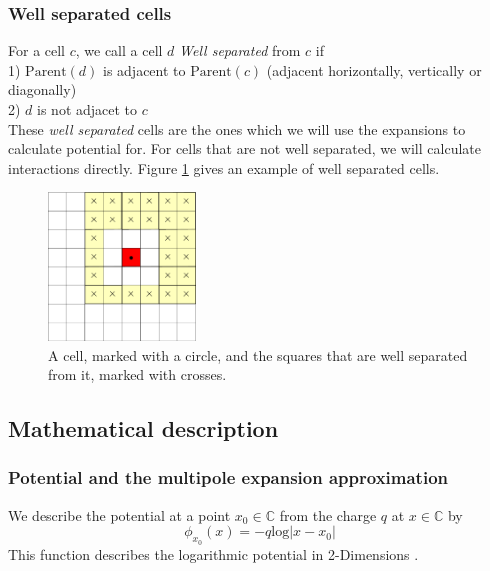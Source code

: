 \documentclass[pdftex,twoside,a4paper]{report}
\newcommand{\bcen}{\begin{center}}
\newcommand{\ecen}{\end{center}}
\begin{document}
\subsubsection{Well separated cells}
\label{sec:well_sep}
For a cell $c$, we call a cell $d$ \emph{Well separated} from $c$ if\\
1) $\text{Parent}(d)$ is adjacent to $\text{Parent}(c)$ (adjacent horizontally, vertically or diagonally)\\
2) $d$ is not adjacet to $c$\\
\newline
These \emph{well separated} cells are the ones which we will use the expansions to calculate potential for. For cells that are not well separated, we will calculate interactions directly. Figure \ref{fig:pme_wellsep} gives an example of well separated cells.
\begin{figure}[h]
\bcen \includegraphics[width=0.35\textwidth]{figures/wellsep.pdf} \ecen
\caption{A cell, marked with a circle, and the squares that are well separated from it, marked with crosses.}
\label{fig:pme_wellsep}
\end{figure}

\subsection{Mathematical description}
\label{sec:fma_math}
\subsubsection{Potential and the multipole expansion approximation}
We describe the potential at a point $x_0 \in \mathbb{C}$ from the charge $q$ at $x \in \mathbb{C}$ by
\begin{equation}
\phi_{x_0}(x) = -q\text{log}{|x - x_0|}
\label{eq:potential}
\end{equation}
This function describes the logarithmic potential in 2-Dimensions \cite{greengard:315} \cite{samaj}.\\
\end{document}
